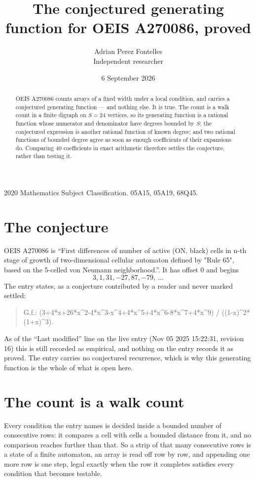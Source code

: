 \documentclass[11pt,a4paper]{article}
\title{The conjectured generating function for OEIS A270086, proved}
\author{Adrian Perez Fontelles\\ \small Independent researcher}
\date{6 September 2026}
\theoremstyle{plain}
\theoremstyle{definition}
\begin{document}
\maketitle

\begin{abstract}
OEIS A270086 counts arrays of a fixed width under a local condition, and carries a conjectured
generating function --- and nothing else. It is true. The count is a walk count in a finite
digraph on $S=24$ vertices, so its generating function is a rational function whose numerator
and denominator have degrees bounded by $S$; the conjectured expression is another rational
function of known degree; and two rational functions of bounded degree agree as soon as enough
coefficients of their expansions do. Comparing $40$ coefficients in exact arithmetic
therefore settles the conjecture, rather than testing it.
\end{abstract}

\noindent\small 2020 Mathematics Subject Classification. 05A15, 05A19, 68Q45.\normalsize

\section{The conjecture}

OEIS A270086 is ``First differences of number of active (ON, black) cells in n-th stage of growth of two-dimensional cellular automaton defined by "Rule 65", based on the 5-celled von Neumann neighborhood.''. It has offset $0$ and begins
\[
3, 1, 31, -27, 87, -79,\ \dots
\]
The entry states, as a conjecture contributed by a reader and never marked settled:
\begin{quote}
G.f.: (3+4*x+26*x\^{}2-4*x\^{}3-x\^{}4+4*x\^{}5+4*x\^{}6-8*x\^{}7+4*x\^{}9) / ((1-x)\^{}2*(1+x)\^{}3).
\end{quote}
As of the ``Last modified'' line on the live entry (Nov 05 2025 15:22:31, revision 16) this is still
recorded as empirical, and nothing on the entry records it as proved. The entry carries no
conjectured recurrence, which is why this generating function is the whole of what is open
here.

\section{The count is a walk count}

Every condition the entry names is decided inside a bounded number of consecutive rows: it
compares a cell with cells a bounded distance from it, and no comparison reaches further than
that. So a strip of that many consecutive rows is a state of a finite automaton, an array is
read off row by row, and appending one more row is one step, legal exactly when the row it
completes satisfies every condition that becomes testable.
\end{document}
